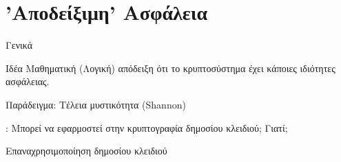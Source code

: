 \documentclass[handout]{beamer}
\begin{document}
\section{'Αποδείξιμη' Ασφάλεια}

\begin{frame}{Γενικά}

\begin{block}{Ιδέα}
Μαθηματική (Λογική) απόδειξη ότι το κρυπτοσύστημα έχει κάποιες ιδιότητες ασφάλειας.
\end{block}

Παράδειγμα: Τέλεια μυστικότητα (Shannon)

: Μπορεί να εφαρμοστεί στην κρυπτογραφία δημοσίου κλειδιού; Γιατί;

\pause 

Επαναχρησιμοποίηση δημοσίου κλειδιού

\end{frame}
\end{document}
